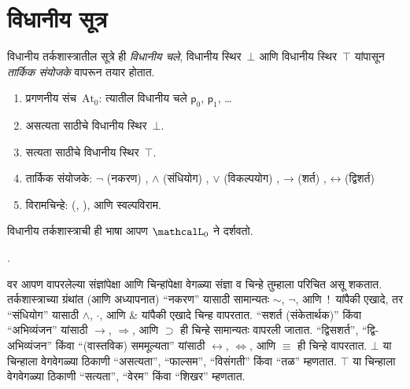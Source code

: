 \documentclass[11pt,a4paper,openany]{book}
\theoremstyle{definition}
\newcommand{\lif}{\mathbin{\to}}
\newenvironment{intro}{}{}
\newcommand{\liff}{\mathbin{\leftrightarrow}}
\newcommand{\applytofirst}[2]{{\expandafter#1#2}}
\newcommand{\Lang}[1]{\applytofirst{\mathcal}{#1}}
\newcommand{\Obj}[1]{\mathsf{#1}}
\newcommand{\PVar}{\mathrm{At}_0}
\newcommand{\lfalse}{\bot}
\newcommand{\ltrue}{\top}
\def\startycommalist{\def\ycomma{\def\ycomma{, }}}
\begin{document}
\section{विधानीय सूत्र}\label{pl:syn:fml:sec}

विधानीय तर्कशास्त्रातील सूत्रे ही
\emph{विधानीय चले}, विधानीय
  स्थिर~$\lfalse$
    आणि विधानीय स्थिर~$\ltrue$ यांपासून \emph{तार्किक
  संयोजके} वापरून तयार होतात.

\begin{enumerate}
\item प्रगणनीय संच~$\PVar$: त्यातील विधानीय चले
  $\Obj p_0$, $\Obj p_1$, \dots
\item असत्यता साठीचे विधानीय स्थिर~$\lfalse$.
\item सत्यता साठीचे विधानीय स्थिर~$\ltrue$.
\item तार्किक संयोजके:
  \startycommalist
  \ycomma $\lnot$ (नकरण)%
  \ycomma $\land$ (संधियोग)%
  \ycomma $\lor$ (विकल्पयोग)%
  \ycomma $\lif$ (शर्त)%
  \ycomma $\liff$ (द्विशर्त)%
\item विरामचिन्हे: (, ), आणि स्वल्पविराम.
\end{enumerate}

विधानीय तर्कशास्त्राची ही भाषा आपण $\Lang L_0$ ने दर्शवतो.

.




\begin{intro}
वर आपण वापरलेल्या संज्ञांपेक्षा आणि चिन्हांपेक्षा वेगळ्या संज्ञा व
चिन्हे तुम्हाला परिचित असू शकतात. तर्कशास्त्राच्या ग्रंथांत (आणि
अध्यापनात) ``नकरण'' यासाठी सामान्यतः $\sim$, $\neg$, आणि~!\ यांपैकी
एखादे, तर ``संधियोग'' यासाठी $\wedge$, $\cdot$, आणि $\&$ यांपैकी
एखादे चिन्ह वापरतात. ``सशर्त (संकेतार्थक)'' किंवा ``अभिव्यंजन'' यांसाठी
$\rightarrow$, $\Rightarrow$, आणि $\supset$ ही चिन्हे सामान्यतः
वापरली जातात.
``द्विसशर्त'', ``द्वि-अभिव्यंजन'' किंवा
  ``(वास्तविक) सममूल्यता'' यांसाठी $\leftrightarrow$,
  $\Leftrightarrow$, आणि $\equiv$ ही चिन्हे वापरतात.
$\lfalse$ या चिन्हाला वेगवेगळ्या ठिकाणी
  ``असत्यता'', ``फाल्सम'', ``विसंगती'' किंवा ``तळ'' म्हणतात.
$\ltrue$ या चिन्हाला वेगवेगळ्या ठिकाणी
  ``सत्यता'', ``वेरम'' किंवा ``शिखर'' म्हणतात.
\end{intro}
\end{document}
